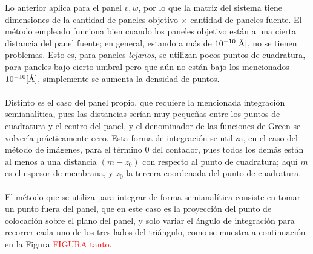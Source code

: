 \documentclass[12pt, notitlepage]{article}
\numberwithin{equation}{section}
\newcommand{\angstrom}{\text{\normalfont\AA}}
\begin{document}
Lo anterior aplica para el panel $v,w$, por lo que la matriz del sistema tiene dimensiones de la cantidad de paneles objetivo $\times$ cantidad de paneles fuente. El método empleado funciona bien cuando los paneles objetivo están a una cierta distancia del panel fuente; en general, estando a más de $10^{-10} [\angstrom]$, no se tienen problemas. Esto es, para paneles \textit{lejanos}, se utilizan pocos puntos de cuadratura, para paneles bajo cierto umbral pero que aún no están bajo los mencionados $10^{-10} [\angstrom]$, simplemente se aumenta la densidad de puntos.\\\\
Distinto es el caso del panel propio, que requiere la mencionada integración semianalítica, pues las distancias serían muy pequeñas entre los puntos de cuadratura y el centro del panel, y el denominador de las funciones de Green se volvería prácticamente cero. Esta forma de integración se utiliza, en el caso del método de imágenes, para el término 0 del contador, pues todos los demás están al menos a una distancia $(m - z_0)$ con respecto al punto de cuadratura; aquí $m$ es el espesor de membrana, y $z_0$ la tercera coordenada del punto de cuadratura.\\\\
El método que se utiliza para integrar de forma semianalítica consiste en tomar un punto fuera del panel, que en este caso es la proyección del punto de colocación sobre el plano del panel, y solo variar el ángulo de integración para recorrer cada uno de los tres lados del triángulo, como se muestra a continuación en la Figura \textcolor{red}{FIGURA tanto}.

%
\end{document}
